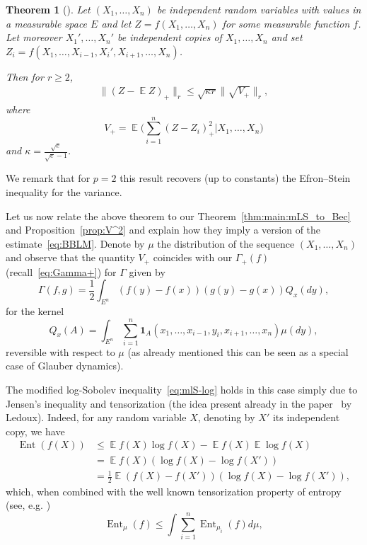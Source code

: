 \documentclass[a4paper]{amsart}
\newtheorem{theorem}{Theorem}[section]
\theoremstyle{definition}
\theoremstyle{remark}
\numberwithin{equation}{section}
\DeclareMathOperator{\EE}{\mathbb{E}} %
\DeclareMathOperator{\Ent}{Ent}	%
\newcommand*{\ind}[1]{\mathbf{1}_{#1}}
\begin{document}
\begin{theorem}[{\cite[Theorem 2]{MR2123200}}]
\label{thm:BBLM}
Let $(X_1,\ldots,X_n)$ be independent random variables with values in a measurable space $E$ and let $Z = f(X_1,\ldots,X_n)$ for some measurable function $f$. Let moreover $X_1',\ldots,X_n'$ be independent copies of $X_1,\ldots,X_n$
and set $Z_i = f(X_1,\ldots,X_{i-1},X_i',X_{i+1},\ldots,X_n)$.

Then for $r \ge 2$,
\begin{align}\label{eq:BBLM}
  \|(Z - \EE Z)_+\|_r \le \sqrt{\kappa r}\|\sqrt{V_+}\|_r,
\end{align}
where
\begin{displaymath}
  V_+ = \EE\Big(\sum_{i=1}^n (Z - Z_i)_+^2\Big|X_1,\ldots,X_n\Big)
\end{displaymath}
and $\kappa = \frac{\sqrt{e}}{\sqrt{e} - 1}$.
\end{theorem}

We remark that for $p = 2$ this result recovers (up to constants) the Efron--Stein inequality for the variance.

Let us now relate the above theorem to our Theorem~\ref{thm:main:mLS_to_Bec} and Proposition~\ref{prop:V^2} and explain how they imply a version of the estimate~\eqref{eq:BBLM}. Denote by $\mu$  the distribution of the sequence $(X_1,\ldots,X_n)$ and observe that the quantity $V_+$ coincides with our $\Gamma_+(f)$ (recall~\eqref{eq:Gamma+}) for $\Gamma$ given by
\begin{displaymath}
  \Gamma(f,g) = \frac{1}{2}\int_{E^n} (f(y) - f(x))(g(y) - g(x))Q_x(dy),
\end{displaymath}
for the kernel
\begin{displaymath}
Q_x(A) = \int_{E^n}\sum_{i=1}^n \ind{A}(x_1,\ldots,x_{i-1},y_i,x_{i+1},\ldots,x_n) \mu(dy),
\end{displaymath}
reversible with respect to $\mu$ (as already mentioned this can be seen as a special case of Glauber dynamics).




The modified log-Sobolev inequality~\eqref{eq:mlS-log} holds in this case simply due to  Jensen's inequality and tensorization (the idea present already in the paper~\cite{MR1399224} by Ledoux).
Indeed, for any random variable $X$, denoting by $X'$ its independent copy, we have
\begin{align*}
  \Ent(f(X)) & \le \EE f(X)\log f(X) - \EE f(X)\EE\log f(X) \\
  & = \EE f(X)(\log f(X) - \log f(X')) \\
  &= \frac{1}{2} \EE (f(X) - f(X'))(\log f(X) - \log f(X')),
\end{align*}
which, when combined with the well known tensorization property of entropy (see, e.g. \cite[Theorem 4.10]{MR3185193})
\begin{displaymath}
  \Ent_{\mu}(f) \le \int  \sum_{i=1}^n \Ent_{\mu_i}(f) d\mu,
\end{displaymath}
\end{document}
